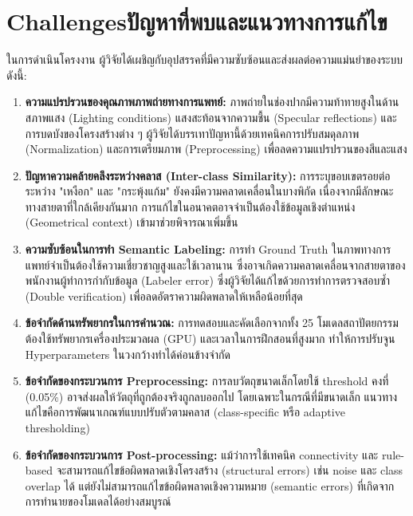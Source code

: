 \section{\ifenglish Challenges\else ปัญหาที่พบและแนวทางการแก้ไข\fi}
ในการดำเนินโครงงาน ผู้วิจัยได้เผชิญกับอุปสรรคที่มีความซับซ้อนและส่งผลต่อความแม่นยำของระบบ ดังนี้:
\begin{enumerate}
    \item \textbf{ความแปรปรวนของคุณภาพภาพถ่ายทางการแพทย์:} ภาพถ่ายในช่องปากมีความท้าทายสูงในด้านสภาพแสง (Lighting conditions) แสงสะท้อนจากความชื้น (Specular reflections) และการบดบังของโครงสร้างต่าง ๆ ผู้วิจัยได้บรรเทาปัญหานี้ด้วยเทคนิคการปรับสมดุลภาพ (Normalization) และการเตรียมภาพ (Preprocessing) เพื่อลดความแปรปรวนของสีและแสง
    \item \textbf{ปัญหาความคล้ายคลึงระหว่างคลาส (Inter-class Similarity):} การระบุขอบเขตรอยต่อระหว่าง "เหงือก" และ "กระพุ้งแก้ม" ยังคงมีความคลาดเคลื่อนในบางพิกัด เนื่องจากมีลักษณะทางสายตาที่ใกล้เคียงกันมาก การแก้ไขในอนาคตอาจจำเป็นต้องใช้ข้อมูลเชิงตำแหน่ง (Geometrical context) เข้ามาช่วยพิจารณาเพิ่มขึ้น
    \item \textbf{ความซับซ้อนในการทำ Semantic Labeling:} การทำ Ground Truth ในภาพทางการแพทย์จำเป็นต้องใช้ความเชี่ยวชาญสูงและใช้เวลานาน ซึ่งอาจเกิดความคลาดเคลื่อนจากสายตาของพนักงานผู้ทำการกำกับข้อมูล (Labeler error) ซึ่งผู้วิจัยได้แก้ไขด้วยการทำการตรวจสอบซ้ำ (Double verification) เพื่อลดอัตราความผิดพลาดให้เหลือน้อยที่สุด
    \item \textbf{ข้อจำกัดด้านทรัพยากรในการคำนวณ:} การทดสอบและคัดเลือกจากทั้ง 25 โมเดลสถาปัตยกรรมต้องใช้ทรัพยากรเครื่องประมวลผล (GPU) และเวลาในการฝึกสอนที่สูงมาก ทำให้การปรับจูน Hyperparameters ในวงกว้างทำได้ค่อนข้างจำกัด
    \item \textbf{ข้อจำกัดของกระบวนการ Preprocessing:} การลบวัตถุขนาดเล็กโดยใช้ threshold คงที่ (0.05\%) อาจส่งผลให้วัตถุที่ถูกต้องจริงถูกลบออกไป โดยเฉพาะในกรณีที่มีขนาดเล็ก แนวทางแก้ไขคือการพัฒนาเกณฑ์แบบปรับตัวตามคลาส (class-specific หรือ adaptive thresholding)
    \item \textbf{ข้อจำกัดของกระบวนการ Post-processing:} แม้ว่าการใช้เทคนิค connectivity และ rule-based จะสามารถแก้ไขข้อผิดพลาดเชิงโครงสร้าง (structural errors) เช่น noise และ class overlap ได้ แต่ยังไม่สามารถแก้ไขข้อผิดพลาดเชิงความหมาย (semantic errors) ที่เกิดจากการทำนายของโมเดลได้อย่างสมบูรณ์

\end{enumerate}

